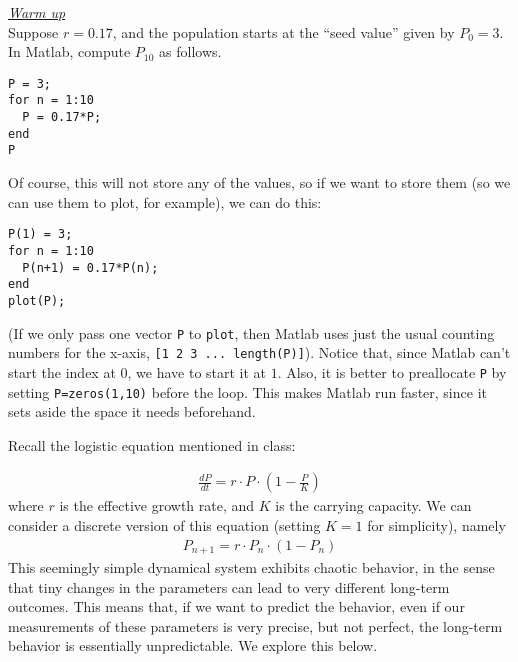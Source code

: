 \documentclass{amsart}
\theoremstyle{plain}
\theoremstyle{definition}
\theoremstyle{remark}
\numberwithin{equation}{section} %
\numberwithin{figure}{section}   %
\newcommand{\pnt}[1]{\left(#1\right)}
\begin{document}
\noindent\underline{\textit{Warm up}}\\
Suppose $r=0.17$, and the population starts at the ``seed value'' given by $P_0 = 3$. In Matlab, compute $P_{10}$ as follows.

\begin{minipage}[h]{5in}
\centering
\begin{lstlisting}
P = 3; 
for n = 1:10
  P = 0.17*P;
end
P
\end{lstlisting}
\end{minipage}

Of course, this will not store any of the values, so if we want to store them (so we can use them to plot, for example), we can do this:

\begin{minipage}[h]{5in}
\centering
\begin{lstlisting}
P(1) = 3; 
for n = 1:10
  P(n+1) = 0.17*P(n);
end
plot(P);
\end{lstlisting}
\end{minipage}

\noindent
(If we only pass one vector \texttt{P} to \texttt{plot}, then Matlab uses just the usual counting numbers for the x-axis, \texttt{[1 2 3 ... length(P)]}).  Notice that, since Matlab can't start the index at $0$, we have to start it at $1$.  Also, it is better to preallocate \texttt{P} by setting \texttt{P=zeros(1,10)} before the loop.  This makes Matlab run faster, since it sets aside the space it needs beforehand.

\pagebreak

Recall the logistic equation mentioned in class:

\begin{align*}
 \frac{dP}{dt} = r\cdot P\cdot\pnt{1-\frac{P}{K}}
\end{align*}
where $r$ is the effective growth rate, and $K$ is the carrying capacity.   We can consider a discrete version of this equation (setting $K=1$ for simplicity), namely 
\begin{align*}
 P_{n+1} = r\cdot P_n\cdot\pnt{1-P_n}
\end{align*}
This seemingly simple dynamical system exhibits chaotic behavior, in the sense that tiny changes in the parameters can lead to very different long-term  outcomes.  This means that, if we want to predict the behavior, even if our measurements of these parameters is very precise, but not perfect, the long-term behavior is essentially unpredictable.  We explore this below.

\bigskip
\end{document}
